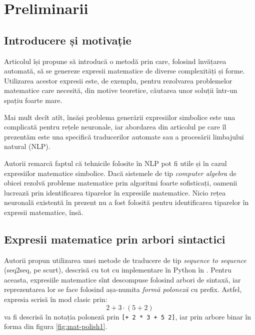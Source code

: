 
\chapter{Preliminarii}

\section{Introducere și motivație}

Articolul își propune să introducă o metodă prin care, folosind
învățarea automată, să se genereze expresii matematice de diverse
complexități și forme. Utilizarea acestor expresii este, de exemplu,
pentru rezolvarea problemelor matematice care necesită, din motive
teoretice, căutarea unor soluții într-un spațiu foarte mare.

Mai mult decît atît, însăși problema generării expresiilor simbolice
este una complicată pentru rețele neuronale, iar abordarea din articolul
\cite{lample2019deep} pe care îl prezentăm este una specifică traducerilor
automate sau a procesării limbajului natural (NLP).

Autorii remarcă faptul că tehnicile folosite în NLP pot fi utile și
în cazul expresiilor matematice simbolice. Dacă sistemele de tip
\emph{computer algebra} de obicei rezolvă probleme matematice prin algoritmi
foarte sofisticați, oamenii lucrează prin identificarea tiparelor în
expresiile matematice. Nicio rețea neuronală existentă în prezent nu a
fost folosită pentru identificarea tiparelor în expresii matematice,
însă.


\section{Expresii matematice prin arbori sintactici}

Autorii propun utilizarea unei metode de traducere de tip \emph{sequence to %
sequence} (seq2seq, pe scurt), descrisă cu tot cu implementare în Python
în \cite{chollet}. Pentru aceasta, expresiile matematice sînt descompuse
folosind arbori de sintaxă, iar reprezentarea lor se face folosind
așa-numita \emph{formă poloneză} cu prefix. Astfel, expresia scrisă în 
mod clasic prin:
\[
    2 + 3 \cdot (5 + 2)
\]
va fi descrisă în notația poloneză prin \texttt{[+ 2 * 3 + 5 2]}, iar
prin arbore binar în forma din figura \ref{fig:mat-polish1}.


